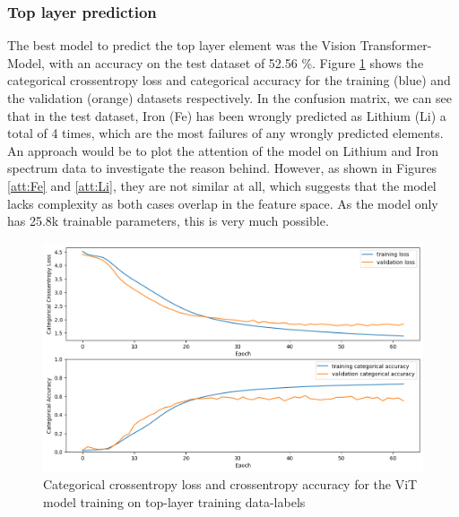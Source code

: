 \subsubsection{Top layer prediction}
The best model to predict the top layer element was the Vision Transformer-Model, with an accuracy on the test dataset of 52.56 \%. Figure \ref{fig:top_best_loss} shows the categorical crossentropy loss and categorical accuracy for the training (blue) and the validation (orange) datasets respectively. In the confusion matrix, we can see that in the test dataset, Iron (Fe) has been wrongly predicted as Lithium (Li) a total of 4 times, which are the most failures of any wrongly predicted elements. An approach would be to plot the attention of the model on Lithium and Iron spectrum data to investigate the reason behind. However, as shown in Figures \ref{att:Fe} and \ref{att:Li}, they are not similar at all, which suggests that the model lacks complexity as both cases overlap in the feature space. As the model only has 25.8k trainable parameters, this is very much possible. 

\begin{figure}[H]
    \centering
    \includegraphics[width=\textwidth]{Figures/top_best_loss_acc_vit_4_32_3_4_64.png}
    \caption{Categorical crossentropy loss and crossentropy accuracy for the ViT model training on top-layer training data-labels}
    \label{fig:top_best_loss}
\end{figure}

